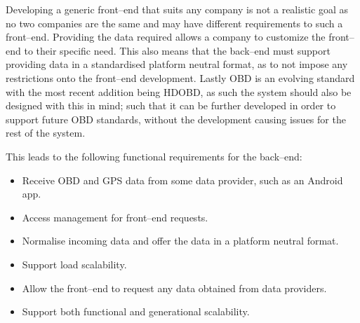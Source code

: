 Developing a generic front--end that suits any company is not a realistic goal as no two companies are the same and may have different requirements to such a front--end.
Providing the data required allows a company to customize the front--end to their specific need.
This also means that the back--end must support providing data in a standardised platform neutral format, as to not impose any restrictions onto the front--end development.
Lastly \ac{OBD} is an evolving standard with the most recent addition being \ac{HDOBD}, as such the system should also be designed with this in mind; such that it can be further developed in order to support future \ac{OBD} standards, without the development causing issues for the rest of the system.

\bigskip
This  leads to the following functional requirements for the back--end:
\begin{itemize}
    \item Receive \ac{OBD} and GPS data from some data provider, such as an Android app.
    \item Access management for front--end requests.
    \item Normalise incoming data and offer the data in a platform neutral format. %
    \item Support load scalability.%
    \item Allow the front--end to request any data obtained from data providers.
    \item Support both functional and generational scalability.
\end{itemize}



